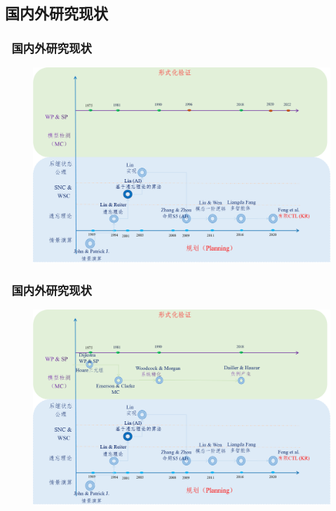 \documentclass[aspectratio=1610, 9pt, CJK]{beamer}
\begin{document}
	\subsection{国内外研究现状} 
		\begin{frame}
		\frametitle{~国内外研究现状}
		\begin{figure}
			\includegraphics[scale=0.45]{figures/historya}
		\end{figure}
	\end{frame}
	\begin{frame}
	\frametitle{~国内外研究现状}
	\begin{figure}
		\includegraphics[scale=0.45]{figures/historyb}
	\end{figure}
\end{frame}
\end{document}
